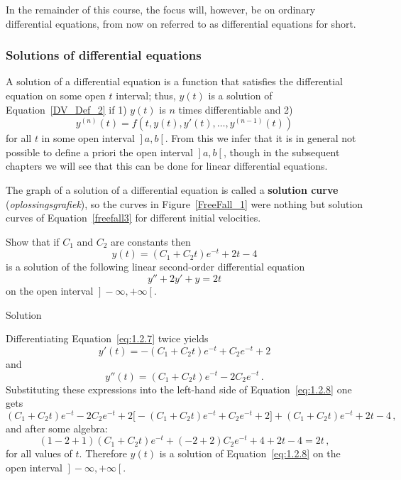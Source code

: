 In the remainder of this course, the focus will, however, be on ordinary differential equations, from now on referred to as differential equations for short. 



\subsubsection{Solutions of differential equations}

A solution of a differential equation is a function that satisfies the differential equation on some open $t$ interval;   thus, $y(t)$
is a solution of Equation~\eqref{DV_Def_2} if 1) $y(t)$ is $n$ times differentiable and 2)
$$
y^{(n)}(t)=f(t,y(t),y'(t), \dots,y^{(n-1)}(t))
$$
for all $t$ in some open interval $\left.\right]a,b\left[\right.$. From this we infer that it is in general not possible to define a priori the open interval $\left.\right]a,b\left[\right.$, though in the subsequent chapters we will see that this can be done for linear differential equations. 

The graph of a solution of a differential equation is called a
\textbf{solution curve} (\textit{oplossingsgrafiek}), so the curves in Figure~\ref{FreeFall_1} were nothing but solution curves of Equation~\eqref{freefall3} for different initial velocities. 


\begin{example}\label{example:1.2.1}
 Show that if $C_1$ and $C_2$ are constants then
\begin{equation} \label{eq:1.2.7}
y(t)=(C_1+C_2t)e^{-t}+2t-4
\end{equation}
 is a solution of the following linear second-order differential equation
\begin{equation} \label{eq:1.2.8}
y''+2y'+y=2t
\end{equation}
 on the open interval $\left.\right]-\infty,+\infty\left[\right.$.
\pagebreak

Solution 

 Differentiating Equation~\eqref{eq:1.2.7} twice yields
$$
y'(t)=-\left(C_1+C_2t\right)e^{-t}+C_2e^{-t}+2
$$
 and
$$
y''(t)=\left(C_1+C_2t\right)e^{-t}-2C_2e^{-t}\,.
$$
Substituting these expressions into the left-hand side of Equation~\eqref{eq:1.2.8} one gets
$$
\left(C_1+C_2t\right)e^{-t}-2C_2e^{-t}+2\big[-\left(C_1+C_2t\right)e^{-t}+C_2e^{-t}+2\big]+\left(C_1+C_2t\right)e^{-t}+2t-4\,,
$$
and after some algebra:
$$
\left(1-2+1\right)\left(C_1+C_2t\right)e^{-t}+\left(-2+2\right)C_2e^{-t}+4+2t-4=2t\,,
$$
for all values of $t$.
Therefore $y(t)$ is a solution of Equation~\eqref{eq:1.2.8} on the open interval $\left.\right]-\infty,+\infty\left[\right.$.
\end{example}

